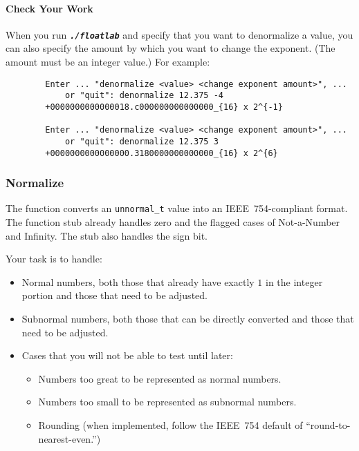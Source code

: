     \paragraph*{Check Your Work}

    When you run \texttt{\textbf{\textit{./floatlab}}} and specify that you want to denormalize a value, you can also specify the amount by which you want to change the exponent.
    (The amount must be an integer value.) For example:

    \begin{verbatim}
        Enter ... "denormalize <value> <change exponent amount>", ...
            or "quit": denormalize 12.375 -4
        +0000000000000018.c000000000000000_{16} x 2^{-1}

        Enter ... "denormalize <value> <change exponent amount>", ...
            or "quit": denormalize 12.375 3
        +0000000000000000.3180000000000000_{16} x 2^{6}
    \end{verbatim}

    \subsubsection{Normalize}

    The  function converts an \lstinline{unnormal_t} value into an IEEE~754-compliant format.
    The function stub already handles zero and the flagged cases of Not-a-Number and Infinity.
    The stub also handles the sign bit.

    Your task is to handle:
    \begin{itemize}
        \item Normal numbers, both those that already have exactly $1$ in the integer portion and those that need to be adjusted.
        \item Subnormal numbers, both those that can be directly converted and those that need to be adjusted.
        \item Cases that you will not be able to test until later:
        \begin{itemize}
            \item Numbers too great to be represented as normal numbers.
            \item Numbers too small to be represented as subnormal numbers.
            \item Rounding (when implemented, follow the IEEE~754 default of ``round-to-nearest-even.'')
        \end{itemize}
    \end{itemize}

